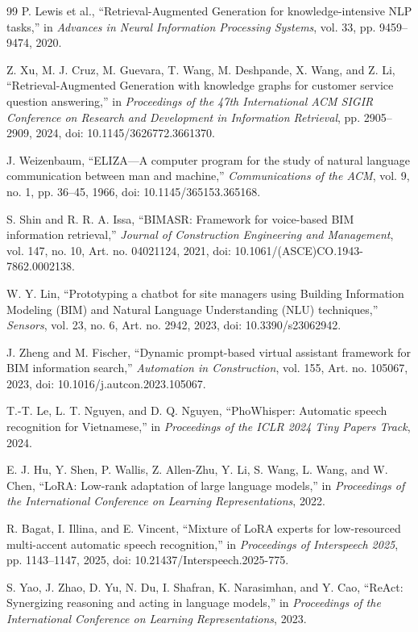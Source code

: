 \documentclass[11pt,a4paper]{article}
\begin{document}
\begin{thebibliography}{99}
P. Lewis et al.,
``Retrieval-Augmented Generation for knowledge-intensive NLP tasks,''
in \textit{Advances in Neural Information Processing Systems}, vol. 33,
pp. 9459--9474, 2020.

Z. Xu, M. J. Cruz, M. Guevara, T. Wang, M. Deshpande, X. Wang, and Z. Li,
``Retrieval-Augmented Generation with knowledge graphs for customer service
question answering,'' in \textit{Proceedings of the 47th International ACM
SIGIR Conference on Research and Development in Information Retrieval},
pp. 2905--2909, 2024, doi: 10.1145/3626772.3661370.

J. Weizenbaum,
``ELIZA---A computer program for the study of natural language communication
between man and machine,'' \textit{Communications of the ACM}, vol. 9, no. 1,
pp. 36--45, 1966, doi: 10.1145/365153.365168.

S. Shin and R. R. A. Issa,
``BIMASR: Framework for voice-based BIM information retrieval,''
\textit{Journal of Construction Engineering and Management}, vol. 147,
no. 10, Art. no. 04021124, 2021,
doi: 10.1061/(ASCE)CO.1943-7862.0002138.

W. Y. Lin,
``Prototyping a chatbot for site managers using Building Information Modeling
(BIM) and Natural Language Understanding (NLU) techniques,''
\textit{Sensors}, vol. 23, no. 6, Art. no. 2942, 2023,
doi: 10.3390/s23062942.

J. Zheng and M. Fischer,
``Dynamic prompt-based virtual assistant framework for BIM information
search,'' \textit{Automation in Construction}, vol. 155, Art. no. 105067,
2023, doi: 10.1016/j.autcon.2023.105067.

T.-T. Le, L. T. Nguyen, and D. Q. Nguyen,
``PhoWhisper: Automatic speech recognition for Vietnamese,''
in \textit{Proceedings of the ICLR 2024 Tiny Papers Track}, 2024.

E. J. Hu, Y. Shen, P. Wallis, Z. Allen-Zhu, Y. Li, S. Wang, L. Wang,
and W. Chen,
``LoRA: Low-rank adaptation of large language models,''
in \textit{Proceedings of the International Conference on Learning
Representations}, 2022.

R. Bagat, I. Illina, and E. Vincent,
``Mixture of LoRA experts for low-resourced multi-accent automatic speech
recognition,'' in \textit{Proceedings of Interspeech 2025}, pp. 1143--1147,
2025, doi: 10.21437/Interspeech.2025-775.

S. Yao, J. Zhao, D. Yu, N. Du, I. Shafran, K. Narasimhan, and Y. Cao,
``ReAct: Synergizing reasoning and acting in language models,''
in \textit{Proceedings of the International Conference on Learning
Representations}, 2023.

\end{thebibliography}
\endgroup
\end{document}
